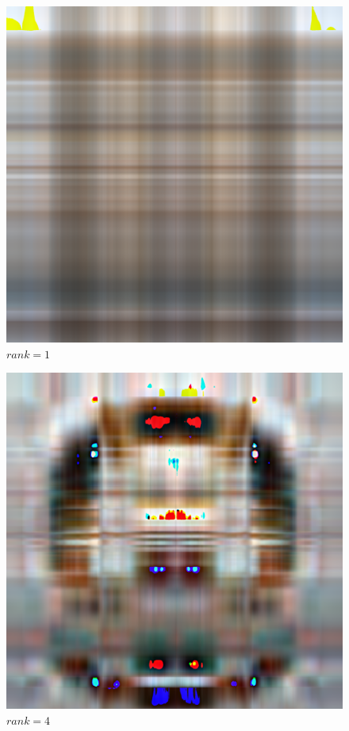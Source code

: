 \begin{figure}
  \includegraphics[width=\linewidth]{../image-compression-color/cat-1.png}
  \caption{$rank=1$}
  \label{fig:cat-bw-rank-1}
\end{figure}

\begin{figure}
  \includegraphics[width=\linewidth]{../image-compression-color/cat-4.png}
  \caption{$rank=4$}
  \label{fig:cat-bw-rank-4}
\end{figure}

